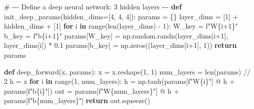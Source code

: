 \documentclass[
  letterpaper,
  numbers=noenddot,
  DIV=11]{scrreprt}
\newenvironment{Shaded}{\begin{snugshade}}{\end{snugshade}}
\newcommand{\BuiltInTok}[1]{\textcolor[rgb]{0.00,0.23,0.31}{#1}}
\newcommand{\CommentTok}[1]{\textcolor[rgb]{0.37,0.37,0.37}{#1}}
\newcommand{\ControlFlowTok}[1]{\textcolor[rgb]{0.00,0.23,0.31}{\textbf{#1}}}
\newcommand{\DecValTok}[1]{\textcolor[rgb]{0.68,0.00,0.00}{#1}}
\newcommand{\FloatTok}[1]{\textcolor[rgb]{0.68,0.00,0.00}{#1}}
\newcommand{\KeywordTok}[1]{\textcolor[rgb]{0.00,0.23,0.31}{\textbf{#1}}}
\newcommand{\NormalTok}[1]{\textcolor[rgb]{0.00,0.23,0.31}{#1}}
\newcommand{\OperatorTok}[1]{\textcolor[rgb]{0.37,0.37,0.37}{#1}}
\newcommand{\SpecialCharTok}[1]{\textcolor[rgb]{0.37,0.37,0.37}{#1}}
\newcommand{\SpecialStringTok}[1]{\textcolor[rgb]{0.13,0.47,0.30}{#1}}
\theoremstyle{plain}
\theoremstyle{definition}
\theoremstyle{remark}
\begin{document}
\begin{Shaded}
\begin{Highlighting}[numbers=left,,]
\CommentTok{\# {-}{-}{-} Define a deep neural network: 3 hidden layers {-}{-}{-}}
\KeywordTok{def}\NormalTok{ init\_deep\_params(hidden\_dims}\OperatorTok{=}\NormalTok{[}\DecValTok{4}\NormalTok{, }\DecValTok{4}\NormalTok{, }\DecValTok{4}\NormalTok{]):}
\NormalTok{    params }\OperatorTok{=}\NormalTok{ \{\}}
\NormalTok{    layer\_dims }\OperatorTok{=}\NormalTok{ [}\DecValTok{1}\NormalTok{] }\OperatorTok{+}\NormalTok{ hidden\_dims }\OperatorTok{+}\NormalTok{ [}\DecValTok{1}\NormalTok{]}
    \ControlFlowTok{for}\NormalTok{ i }\KeywordTok{in} \BuiltInTok{range}\NormalTok{(}\BuiltInTok{len}\NormalTok{(layer\_dims) }\OperatorTok{{-}} \DecValTok{1}\NormalTok{):}
\NormalTok{        W\_key }\OperatorTok{=} \SpecialStringTok{f"W}\SpecialCharTok{\{}\NormalTok{i}\OperatorTok{+}\DecValTok{1}\SpecialCharTok{\}}\SpecialStringTok{"}
\NormalTok{        b\_key }\OperatorTok{=} \SpecialStringTok{f"b}\SpecialCharTok{\{}\NormalTok{i}\OperatorTok{+}\DecValTok{1}\SpecialCharTok{\}}\SpecialStringTok{"}
\NormalTok{        params[W\_key] }\OperatorTok{=}\NormalTok{ np.random.randn(layer\_dims[i}\OperatorTok{+}\DecValTok{1}\NormalTok{], layer\_dims[i]) }\OperatorTok{*} \FloatTok{0.1}
\NormalTok{        params[b\_key] }\OperatorTok{=}\NormalTok{ np.zeros((layer\_dims[i}\OperatorTok{+}\DecValTok{1}\NormalTok{], }\DecValTok{1}\NormalTok{))}
    \ControlFlowTok{return}\NormalTok{ params}

\KeywordTok{def}\NormalTok{ deep\_forward(x, params):}
\NormalTok{    x }\OperatorTok{=}\NormalTok{ x.reshape(}\DecValTok{1}\NormalTok{, }\DecValTok{1}\NormalTok{)}
\NormalTok{    num\_layers }\OperatorTok{=} \BuiltInTok{len}\NormalTok{(params) }\OperatorTok{//} \DecValTok{2}
\NormalTok{    h }\OperatorTok{=}\NormalTok{ x}
    \ControlFlowTok{for}\NormalTok{ i }\KeywordTok{in} \BuiltInTok{range}\NormalTok{(}\DecValTok{1}\NormalTok{, num\_layers):}
\NormalTok{        h }\OperatorTok{=}\NormalTok{ np.tanh(params[}\SpecialStringTok{f"W}\SpecialCharTok{\{}\NormalTok{i}\SpecialCharTok{\}}\SpecialStringTok{"}\NormalTok{] }\OperatorTok{@}\NormalTok{ h }\OperatorTok{+}\NormalTok{ params[}\SpecialStringTok{f"b}\SpecialCharTok{\{}\NormalTok{i}\SpecialCharTok{\}}\SpecialStringTok{"}\NormalTok{])}
\NormalTok{    out }\OperatorTok{=}\NormalTok{ params[}\SpecialStringTok{f"W}\SpecialCharTok{\{}\NormalTok{num\_layers}\SpecialCharTok{\}}\SpecialStringTok{"}\NormalTok{] }\OperatorTok{@}\NormalTok{ h }\OperatorTok{+}\NormalTok{ params[}\SpecialStringTok{f"b}\SpecialCharTok{\{}\NormalTok{num\_layers}\SpecialCharTok{\}}\SpecialStringTok{"}\NormalTok{]}
    \ControlFlowTok{return}\NormalTok{ out.squeeze()}


\end{Highlighting}
\end{Shaded}
\end{document}
